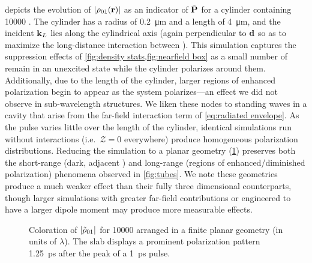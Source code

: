  depicts the evolution of $\abs{\rho_{01}(\vb{r})}$ as an indicator of $\tilde{\vb{P}}$ for a cylinder containing \num{10000} \qds{}.
The cylinder has a radius of \SI{0.2}{\micro\meter} and a length of \SI{4}{\micro\meter}, and the incident $\vb{k}_L$ lies along the cylindrical axis (again perpendicular to $\vb{d}$ so as to maximize the long-distance interaction between \qds{}).
This simulation captures the suppression effects of \cref{fig:density stats,fig:nearfield box} as a small number of \qds{} remain in an unexcited state while the cylinder polarizes around them.
Additionally, due to the length of the cylinder, larger regions of enhanced polarization begin to appear as the system polarizes---an effect we did not observe in sub-wavelength structures.
We liken these nodes to standing waves in a cavity that arise from the far-field interaction term of \cref{eq:radiated envelope}.
As the pulse varies little over the length of the cylinder, identical simulations run without interactions (i.e.~$\mathcal{Z} = 0$ everywhere) produce homogeneous polarization distributions.
Reducing the simulation to a planar geometry (\cref{fig:wide plate}) preserves both the short-range (dark, adjacent \qds{}) and long-range (regions of enhanced/diminished polarization) phenomena observed in \cref{fig:tubes}.
We note these geometries produce a much weaker effect than their fully three dimensional counterparts, though larger simulations with greater far-field contributions or \qds{} engineered to have a larger dipole moment may produce more measurable effects.

\begin{figure}
  \centering
  \caption{\label{fig:wide plate}
    Coloration of $\abs{\tilde{\rho}_{01}}$ for \num{10000} \qds{} arranged in a finite planar geometry (in units of $\lambda$).
    The slab displays a prominent polarization pattern \SI{1.25}{\pico\second} after the peak of a \SI{1}{\pico\second} pulse.
  }
\end{figure}


